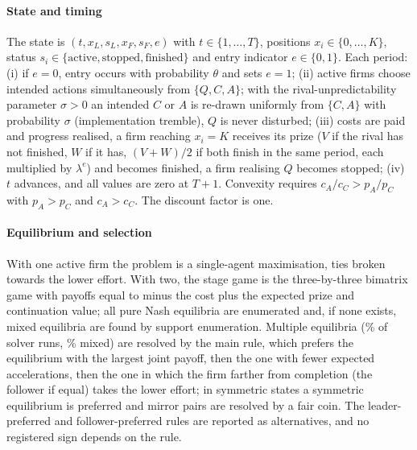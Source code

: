 \documentclass[preprint,12pt,authoryear]{elsarticle}
\begin{document}
\paragraph{State and timing} The state is $(t, x_L, s_L, x_F, s_F, e)$ with $t \in \{1, \ldots, T\}$, positions $x_i \in \{0, \ldots, K\}$, status $s_i \in \{\text{active}, \text{stopped}, \text{finished}\}$ and entry indicator $e \in \{0, 1\}$. Each period: (i) if $e = 0$, entry occurs with probability $\theta$ and sets $e = 1$; (ii) active firms choose intended actions simultaneously from $\{Q, C, A\}$; with the rival-unpredictability parameter $\sigma > 0$ an intended $C$ or $A$ is re-drawn uniformly from $\{C, A\}$ with probability $\sigma$ (implementation tremble), $Q$ is never disturbed; (iii) costs are paid and progress realised, a firm reaching $x_i = K$ receives its prize ($V$ if the rival has not finished, $W$ if it has, $(V+W)/2$ if both finish in the same period, each multiplied by $\lambda^{e}$) and becomes finished, a firm realising $Q$ becomes stopped; (iv) $t$ advances, and all values are zero at $T + 1$. Convexity requires $c_A / c_C > p_A / p_C$ with $p_A > p_C$ and $c_A > c_C$. The discount factor is one.

\paragraph{Equilibrium and selection} With one active firm the problem is a single-agent maximisation, ties broken towards the lower effort. With two, the stage game is the three-by-three bimatrix game with payoffs equal to minus the cost plus the expected prize and continuation value; all pure Nash equilibria are enumerated and, if none exists, mixed equilibria are found by support enumeration. Multiple equilibria (\ModelMultiShare\% of solver runs, \ModelMixedShare\% mixed) are resolved by the main rule, which prefers the equilibrium with the largest joint payoff, then the one with fewer expected accelerations, then the one in which the firm farther from completion (the follower if equal) takes the lower effort; in symmetric states a symmetric equilibrium is preferred and mirror pairs are resolved by a fair coin. The leader-preferred and follower-preferred rules are reported as alternatives, and no registered sign depends on the rule.
\end{document}
